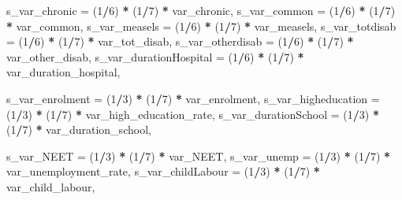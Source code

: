 \documentclass[
]{article}
\newenvironment{Shaded}{\begin{snugshade}}{\end{snugshade}}
\newcommand{\AttributeTok}[1]{\textcolor[rgb]{0.13,0.29,0.53}{#1}}
\newcommand{\DecValTok}[1]{\textcolor[rgb]{0.00,0.00,0.81}{#1}}
\newcommand{\NormalTok}[1]{#1}
\newcommand{\SpecialCharTok}[1]{\textcolor[rgb]{0.81,0.36,0.00}{\textbf{#1}}}
\begin{document}
\begin{Shaded}
\begin{Highlighting}[]
    \AttributeTok{s\_var\_chronic =}\NormalTok{ (}\DecValTok{1}\SpecialCharTok{/}\DecValTok{6}\NormalTok{) }\SpecialCharTok{*}\NormalTok{ (}\DecValTok{1}\SpecialCharTok{/}\DecValTok{7}\NormalTok{) }\SpecialCharTok{*}\NormalTok{ var\_chronic,}
    \AttributeTok{s\_var\_common =}\NormalTok{ (}\DecValTok{1}\SpecialCharTok{/}\DecValTok{6}\NormalTok{) }\SpecialCharTok{*}\NormalTok{ (}\DecValTok{1}\SpecialCharTok{/}\DecValTok{7}\NormalTok{) }\SpecialCharTok{*}\NormalTok{ var\_common,}
    \AttributeTok{s\_var\_measels =}\NormalTok{ (}\DecValTok{1}\SpecialCharTok{/}\DecValTok{6}\NormalTok{) }\SpecialCharTok{*}\NormalTok{ (}\DecValTok{1}\SpecialCharTok{/}\DecValTok{7}\NormalTok{) }\SpecialCharTok{*}\NormalTok{ var\_measels,}
    \AttributeTok{s\_var\_totdisab =}\NormalTok{ (}\DecValTok{1}\SpecialCharTok{/}\DecValTok{6}\NormalTok{) }\SpecialCharTok{*}\NormalTok{ (}\DecValTok{1}\SpecialCharTok{/}\DecValTok{7}\NormalTok{) }\SpecialCharTok{*}\NormalTok{ var\_tot\_disab,}
    \AttributeTok{s\_var\_otherdisab =}\NormalTok{ (}\DecValTok{1}\SpecialCharTok{/}\DecValTok{6}\NormalTok{) }\SpecialCharTok{*}\NormalTok{ (}\DecValTok{1}\SpecialCharTok{/}\DecValTok{7}\NormalTok{) }\SpecialCharTok{*}\NormalTok{ var\_other\_disab,}
    \AttributeTok{s\_var\_durationHospital =}\NormalTok{ (}\DecValTok{1}\SpecialCharTok{/}\DecValTok{6}\NormalTok{) }\SpecialCharTok{*}\NormalTok{ (}\DecValTok{1}\SpecialCharTok{/}\DecValTok{7}\NormalTok{) }\SpecialCharTok{*}\NormalTok{ var\_duration\_hospital,}
    
    \AttributeTok{s\_var\_enrolment =}\NormalTok{ (}\DecValTok{1}\SpecialCharTok{/}\DecValTok{3}\NormalTok{) }\SpecialCharTok{*}\NormalTok{ (}\DecValTok{1}\SpecialCharTok{/}\DecValTok{7}\NormalTok{) }\SpecialCharTok{*}\NormalTok{ var\_enrolment,}
    \AttributeTok{s\_var\_higheducation =}\NormalTok{ (}\DecValTok{1}\SpecialCharTok{/}\DecValTok{3}\NormalTok{) }\SpecialCharTok{*}\NormalTok{ (}\DecValTok{1}\SpecialCharTok{/}\DecValTok{7}\NormalTok{) }\SpecialCharTok{*}\NormalTok{ var\_high\_education\_rate,}
    \AttributeTok{s\_var\_durationSchool =}\NormalTok{ (}\DecValTok{1}\SpecialCharTok{/}\DecValTok{3}\NormalTok{) }\SpecialCharTok{*}\NormalTok{ (}\DecValTok{1}\SpecialCharTok{/}\DecValTok{7}\NormalTok{) }\SpecialCharTok{*}\NormalTok{ var\_duration\_school,}
    
    \AttributeTok{s\_var\_NEET =}\NormalTok{ (}\DecValTok{1}\SpecialCharTok{/}\DecValTok{3}\NormalTok{) }\SpecialCharTok{*}\NormalTok{ (}\DecValTok{1}\SpecialCharTok{/}\DecValTok{7}\NormalTok{) }\SpecialCharTok{*}\NormalTok{ var\_NEET,}
    \AttributeTok{s\_var\_unemp =}\NormalTok{ (}\DecValTok{1}\SpecialCharTok{/}\DecValTok{3}\NormalTok{) }\SpecialCharTok{*}\NormalTok{ (}\DecValTok{1}\SpecialCharTok{/}\DecValTok{7}\NormalTok{) }\SpecialCharTok{*}\NormalTok{ var\_unemployment\_rate,}
    \AttributeTok{s\_var\_childLabour =}\NormalTok{ (}\DecValTok{1}\SpecialCharTok{/}\DecValTok{3}\NormalTok{) }\SpecialCharTok{*}\NormalTok{ (}\DecValTok{1}\SpecialCharTok{/}\DecValTok{7}\NormalTok{) }\SpecialCharTok{*}\NormalTok{ var\_child\_labour,}
    

\end{Highlighting}
\end{Shaded}
\end{document}
